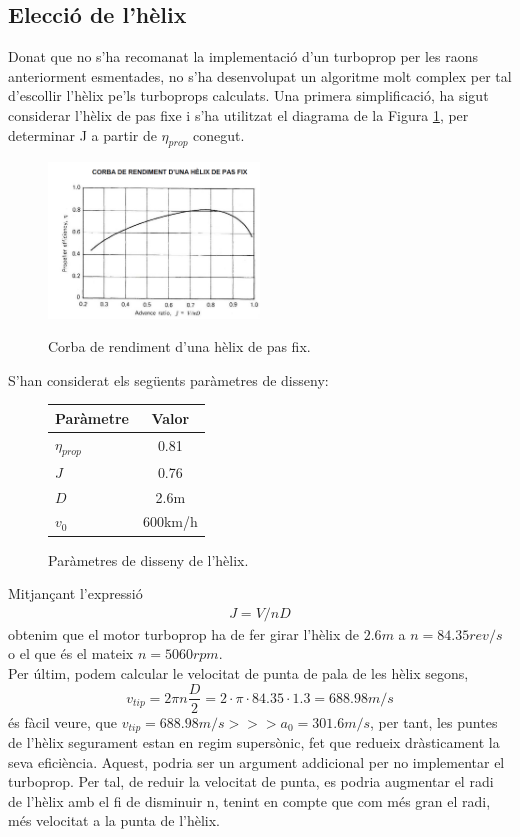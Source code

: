 \subsection{Elecció de l'hèlix}
Donat que no s'ha recomanat la implementació d'un turboprop per les raons anteriorment esmentades, no s'ha desenvolupat un algoritme molt complex per tal d'escollir l'hèlix pe'ls turboprops calculats. Una primera simplificació, ha sigut considerar l'hèlix de pas fixe i s'ha utilitzat el diagrama de la Figura \ref{diag_helix}, per determinar J a partir de $\eta_{prop}$ conegut.

\begin{figure}[H]
	\centering
	\includegraphics[width = 0.5\textwidth]{./pics/diag_helix}
	\label{diag_helix}
	\caption{Corba de rendiment d'una hèlix de pas fix.}
\end{figure}

\noindent S'han considerat els següents paràmetres de disseny:
\begin{figure}[H]
	\centering
	\begin{tabular}{lc}
		\toprule[3pt]
		\textbf{Paràmetre}&\textbf{Valor}\\
		\midrule[1pt]
		$\eta_{prop}$ & 0.81\\
		$J$ & 0.76\\
		$D$ & 2.6m\\
		$v_0$&600km/h\\
				
		\bottomrule[2pt]
	\end{tabular}
	\label{helix_param}
	\caption{Paràmetres de disseny de l'hèlix.}
\end{figure}
Mitjançant l'expressió 
\begin{align}
	J = V/nD
\end{align}
obtenim que el motor turboprop ha de fer girar l'hèlix de $2.6m$ a \textbf{$n=84.35 rev/s$} o el que és el mateix \textbf{$n=5060rpm$}.\\

\noindent Per últim, podem calcular le velocitat de punta de pala de les hèlix segons,
\begin{equation}
	v_{tip}=2\pi n\frac{D}{2} = 2\cdot\pi\cdot84.35\cdot 1.3=688.98m/s
\end{equation}
és fàcil veure, que $v_{tip}=688.98m/s >>> a_0 =  301.6m/s$, per tant, les puntes de l'hèlix segurament estan en regim supersònic, fet que redueix dràsticament la seva eficiència. Aquest, podria ser un argument addicional per no implementar el turboprop. Per tal, de reduir la velocitat de punta, es podria augmentar el radi de l'hèlix amb el fi de disminuir n, tenint en compte que com més gran el radi, més velocitat a la punta de l'hèlix.


\clearpage